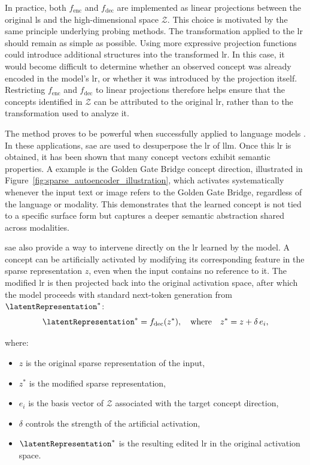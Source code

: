 In practice, both $f_{\text{enc}}$ and $f_{\text{dec}}$ are implemented as linear projections between the original \gls{ls} and the high-dimensional space $\mathcal{Z}$. This choice is motivated by the same principle underlying probing methods. The transformation applied to the \gls{lr} should remain as simple as possible.
Using more expressive projection functions could introduce additional structures into the transformed \gls{lr}. In this case, it would become difficult to determine whether an observed concept was already encoded in the model's \gls{lr}, or whether it was introduced by the projection itself. Restricting $f_{\text{enc}}$ and $f_{\text{dec}}$ to linear projections therefore helps ensure that the concepts identified in $\mathcal{Z}$ can be attributed to the original \gls{lr}, rather than to the transformation used to analyze it.

The method proves to be powerful when successfully applied to language models \cite{templeton2024scaling}.
In these applications, \gls{sae} are used to desuperpose the \gls{lr} of \gls{llm}.
Once this \gls{lr} is obtained, it has been shown that many concept vectors exhibit semantic properties.
A example is the Golden Gate Bridge concept direction, illustrated in Figure~\ref{fig:sparse_autoencoder_illustration}, which activates systematically whenever the input text or image refers to the Golden Gate Bridge, regardless of the language or modality.
This demonstrates that the learned concept is not tied to a specific surface form but captures a deeper semantic abstraction shared across modalities.



\gls{sae} also provide a way to intervene directly on the \gls{lr} learned by the model.
A concept can be artificially activated by modifying its corresponding feature in the sparse representation $z$, even when the input contains no reference to it.
The modified \gls{lr} is then projected back into the original activation space, after which the model proceeds with standard next-token generation from $\latentRepresentation^{*}$:
\[
\latentRepresentation^{*} = f_{\text{dec}}(z^*), \quad \text{where} \quad z^* = z + \delta \, e_i,
\]

where:
\begin{itemize}
    \item $z$ is the original sparse representation of the input,
    \item $z^*$ is the modified sparse representation,
    \item $e_i$ is the basis vector of $\mathcal{Z}$ associated with the target concept direction,
    \item $\delta$ controls the strength of the artificial activation,
    \item $\latentRepresentation^{*}$ is the resulting edited \gls{lr} in the original activation space.
\end{itemize}

